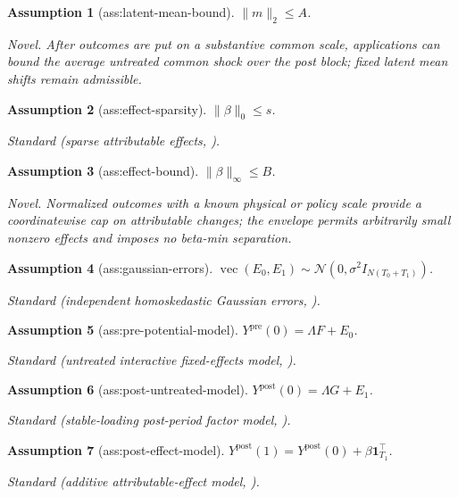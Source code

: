 \documentclass{article}
\newtheorem{assumption}{Assumption}
\begin{document}
\begin{assumption}[ass:latent-mean-bound]\label{ass:latent-mean-bound}
\(\|m\|_2\le A\).
\par\smallskip\noindent\emph{Novel.} After outcomes are put on a substantive common scale, applications can bound the average untreated common shock over the post block; fixed latent mean shifts remain admissible.
\end{assumption}

\begin{assumption}[ass:effect-sparsity]\label{ass:effect-sparsity}
\(\|\beta\|_0\le s\).
\par\smallskip\noindent\emph{Standard} (sparse attributable effects, \cite{HeLiShiMiao2026}).
\end{assumption}

\begin{assumption}[ass:effect-bound]\label{ass:effect-bound}
\(\|\beta\|_\infty\le B\).
\par\smallskip\noindent\emph{Novel.} Normalized outcomes with a known physical or policy scale provide a coordinatewise cap on attributable changes; the envelope permits arbitrarily small nonzero effects and imposes no beta-min separation.
\end{assumption}

\begin{assumption}[ass:gaussian-errors]\label{ass:gaussian-errors}
\(\operatorname{vec}(E_0,E_1)\sim\mathcal N(0,\sigma^2I_{N(T_0+T_1)})\).
\par\smallskip\noindent\emph{Standard} (independent homoskedastic Gaussian errors, \cite{NaumovSpokoinyUlyanov2017}).
\end{assumption}

\begin{assumption}[ass:pre-potential-model]\label{ass:pre-potential-model}
\(Y^{\mathrm{pre}}(0)=\Lambda F+E_0\).
\par\smallskip\noindent\emph{Standard} (untreated interactive fixed-effects model, \cite{HeLiShiMiao2026}).
\end{assumption}

\begin{assumption}[ass:post-untreated-model]\label{ass:post-untreated-model}
\(Y^{\mathrm{post}}(0)=\Lambda G+E_1\).
\par\smallskip\noindent\emph{Standard} (stable-loading post-period factor model, \cite{HeLiShiMiao2026}).
\end{assumption}

\begin{assumption}[ass:post-effect-model]\label{ass:post-effect-model}
\(Y^{\mathrm{post}}(1)=Y^{\mathrm{post}}(0)+\beta\mathbf 1_{T_1}^{\top}\).
\par\smallskip\noindent\emph{Standard} (additive attributable-effect model, \cite{HeLiShiMiao2026}).
\end{assumption}
\end{document}
